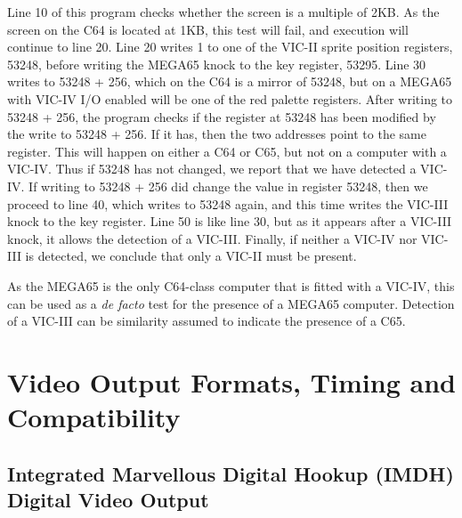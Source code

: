 
Line 10 of this program checks whether the screen is a multiple of 2KB.
As the screen on the C64 is located at 1KB, this test will fail, and execution
will continue to line 20.  Line 20 writes 1 to one of the VIC-II sprite position
registers, 53248, before writing the MEGA65 knock to the key register, 53295.
Line 30 writes to 53248 + 256, which on the C64 is a mirror of 53248, but on a
MEGA65 with VIC-IV I/O enabled will be one of the red palette registers.
After writing to 53248 + 256, the program checks if the register at 53248 has
been modified by the write to 53248 + 256.  If it has, then the two addresses
point to the same register.  This will happen on either a C64 or C65, but not on
a computer with a VIC-IV.  Thus if 53248 has not changed, we report that we have detected a VIC-IV.
If writing to 53248 + 256 did change the value in register 53248, then we proceed
to line 40, which writes to 53248 again, and this time writes the VIC-III knock to
the key register.  Line 50 is like line 30, but as it appears after a VIC-III knock,
it allows the detection of a VIC-III.  Finally, if neither a VIC-IV nor VIC-III
is detected, we conclude that only a VIC-II must be present.

As the MEGA65 is the only C64-class computer that is fitted with a
VIC-IV, this can be used as a {\em de facto} test for the presence of
a MEGA65 computer. Detection of a VIC-III can be similarity assumed to
indicate the presence of a C65.

\section{Video Output Formats, Timing and Compatibility}

\subsection{Integrated Marvellous Digital Hookup\texttrademark{} (IMDH\texttrademark{})
  Digital Video Output}

